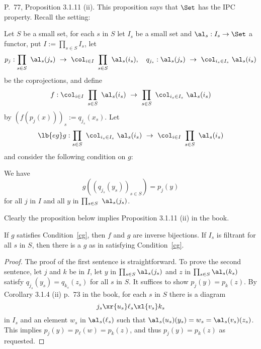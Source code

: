 \documentclass[12pt]{article}
\theoremstyle{remark}
\theoremstyle{definition}
\begin{document}
\begin{s}
P.~77, Proposition 3.1.11 (ii). This proposition says that $\Set$ has the IPC property. Recall the setting:

Let $S$ be a small set, for each $s$ in $S$ let $I_s$ be a small set and $\al_s:I_s\to\Set$ a functor, put $I:=\prod_{s\in S}I_s$, let 
$$
p_j:\prod_{s\in S}\ \al_s(j_s)\ \to\ \col_{i\in I}\ \prod_{s\in S}\ \al_s(i_s),\quad q_{j_s}:\al_s(j_s)\ \to\ \col_{i_s\in I_s}\ \al_s(i_s)
$$ 
be the coprojections, and define  
$$
f:\col_{i\in I}\ \prod_{s\in S}\ \al_s(i_s)\ \to\ \prod_{s\in S}\ \col_{i_s\in I_s}\ \al_s(i_s)
$$ 
by $(f(p_j(x)))_s:=q_{j_s}(x_s)$. Let 
\begin{equation}\lb{eg}
g:\prod_{s\in S}\ \col_{i_s\in I_s}\ \al_s(i_s)\ \to\ \col_{i\in I}\ \prod_{s\in S}\ \al_s(i_s)
\end{equation} 
and consider the following condition on $g$:
\begin{cond} 
We have 
$$
g((q_{j_s}(y_s))_{s\in S})=p_j(y)
$$ 
for all $j$ in $I$ and all $y$ in $\prod_{s\in S}\ \al_s(j_s)$.
\end{cond} 

Clearly the proposition below implies Proposition 3.1.11 (ii) in the book.

\begin{prop}  
If $g$ satisfies Condition~\ref{cg}, then $f$ and $g$ are inverse bijections. If $I_s$ is filtrant for all $s$ in $S$, then there is a $g$ as in  satisfying Condition~\ref{cg}.
\end{prop} 
\begin{proof}
The proof of the first sentence is straightforward. To prove the second sentence, let $j$ and $k$ be in $I$, let $y$ in $\prod_{s\in S}\al_s(j_s)$ and $z$ in $\prod_{s\in S}\al_s(k_s)$ satisfy $q_{j_s}(y_s)=q_{k_s}(z_s)$ for all $s$ in $S$. It suffices to show $p_j(y)=p_k(z)$. By Corollary 3.1.4 (ii) p.~73 in the book, for each $s$ in $S$ there is a diagram 
$$
j_s\xr{u_s}\ell_s\xl{v_s}k_s
$$ 
in $I_s$ and an element $w_s$ in $\al_s(\ell_s)$ such that $\al_s(u_s)(y_s)=w_s=\al_s(v_s)(z_s)$. This implies $p_j(y)=p_\ell(w)=p_k(z)$, and thus $p_j(y)=p_k(z)$ as requested.
\end{proof}
\end{s}
\end{document}
